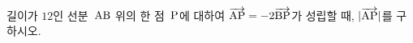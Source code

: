 길이가 $12$인 선분~$\mathrm{AB}$ 위의 한 점~$\mathrm{P}$에 대하여 $\overrightarrow{\mathrm{AP}}=-2\overrightarrow{\mathrm{BP}}$가 성립할 때, $|\overrightarrow{\mathrm{AP}}|$를 구하시오.
